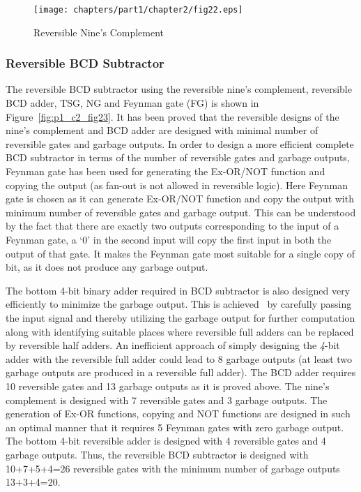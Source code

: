 \begin{figure}[!tbh]
\centering
\texttt{[image: chapters/part1/chapter2/fig22.eps]}
\caption{Reversible Nine's Complement}
\label{fig:p1_c2_fig22}
\end{figure}

\subsubsection{Reversible BCD Subtractor}
The reversible BCD subtractor using the reversible nine's complement, reversible BCD adder, TSG, NG and Feynman gate (FG) is shown in Figure~\ref{fig:p1_c2_fig23}. It has been proved that the reversible designs of the nine's complement and BCD adder are designed with minimal number of reversible gates and garbage outputs. In order to design a more efficient complete BCD subtractor in terms of the number of reversible gates and garbage outputs, Feynman gate has been used for generating the Ex-OR/NOT function and copying the output (as fan-out is not allowed in reversible logic). Here Feynman gate is chosen as it can generate Ex-OR/NOT function and copy the output with minimum number of reversible gates and garbage output. This can be understood by the fact that there are exactly two outputs corresponding to the input of a Feynman gate, a `0' in the second input will copy the first input in both the output of that gate. It makes the Feynman gate most suitable for a single copy of bit, as it does not produce any garbage output.


The bottom {4}-bit binary adder required in BCD subtractor is also designed very efficiently to minimize the garbage output. This is achieved~ by carefully passing the input signal and thereby utilizing the garbage output for further computation along with identifying suitable places where reversible full adders can be replaced by reversible half adders. An inefficient approach of simply designing the \textit{4}-bit adder with the reversible full adder could lead to 8 garbage outputs (at least two garbage outputs are produced in a reversible full adder). The BCD adder requires 10 reversible gates and 13 garbage outputs as it is proved above. The nine's complement is designed with 7 reversible gates and 3 garbage outputs. The generation of Ex-OR functions, copying and NOT functions are designed in such an optimal manner that it requires 5 Feynman gates with zero garbage output. The bottom {4}-bit reversible adder is designed with 4 reversible gates and 4 garbage outputs. Thus, the reversible BCD subtractor is designed with 10+7+5+4=26 reversible gates with the minimum number of garbage outputs 13+3+4=20.

